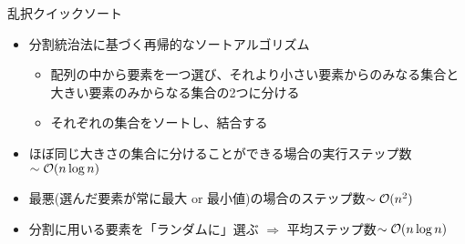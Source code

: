 \begin{frame}[t,fragile]{乱択クイックソート}
  \begin{itemize}
  \item 分割統治法に基づく再帰的なソートアルゴリズム
    \begin{itemize}
      \item 配列の中から要素を一つ選び、それより小さい要素からのみなる集合と大きい要素のみからなる集合の2つに分ける
      \item それぞれの集合をソートし、結合する
    \end{itemize}
    \item ほぼ同じ大きさの集合に分けることができる場合の実行ステップ数$\sim {\cal O}(n \log n)$
    \item 最悪(選んだ要素が常に最大 or 最小値)の場合のステップ数$\sim {\cal O}(n^2)$
    \item 分割に用いる要素を「ランダムに」選ぶ $\Rightarrow$ 平均ステップ数$\sim {\cal O}(n \log n)$
  \end{itemize}
\end{frame}
